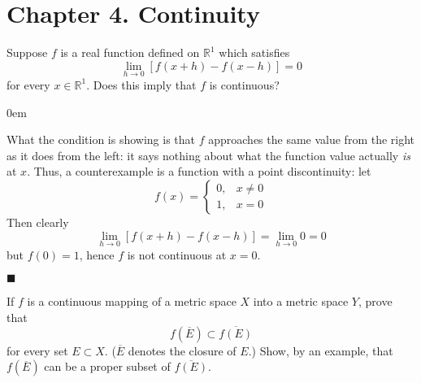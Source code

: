 \documentclass[12pt]{article}
\renewcommand{\qed}{\hfill$\blacksquare$}
\renewenvironment{proof}{\begin{addmargin}[1em]{0em}\begin{newproof}}{\end{newproof}\end{addmargin}\qed}
\newenvironment{problem}[2][Exercise]{\begin{trivlist}
\item[\hskip \labelsep {\bfseries #1}\hskip \labelsep {\bfseries #2.}]}{\end{trivlist}}
\begin{document}
\newpage
\section*{Chapter 4. Continuity}

\begin{problem}{4.1}
Suppose $f$ is a real function defined on $\mathbb{R}^1$ which satisfies $$ \lim_{h\rightarrow 0} \left[f\left(x+h\right)-f\left(x-h\right)\right] = 0 $$ for every $x\in \mathbb{R}^1$. Does this imply that $f$ is continuous?
\end{problem}
\begin{proof}
What the condition is showing is that $f$ approaches the same value from the right as it does from the left: it says nothing about what the function value actually \textit{is} at $x$. Thus, a counterexample is a function with a point discontinuity: let $$ f\left(x\right) = \left\{ \begin{array}{rl} 0, & x \neq 0 \\ 1, & x=0 \end{array} \right. $$ Then clearly $$ \lim_{h\rightarrow 0} \left[f\left(x+h\right)-f\left(x-h\right)\right] = \lim_{h\rightarrow 0} 0 = 0 $$ but $f\left(0\right) = 1$, hence $f$ is not continuous at $x=0$.
\end{proof}

\begin{problem}{4.2}
If $f$ is a continuous mapping of a metric space $X$ into a metric space $Y$, prove that $$ f\left(\overline{E}\right) \subset \overline{f\left(E\right)} $$ for every set $E\subset X$. ($\overline{E}$ denotes the closure of $E$.) Show, by an example, that $f\left(\overline{E}\right)$ can be a proper subset of $\overline{f\left(E\right)}$.
\end{problem}
\end{document}
